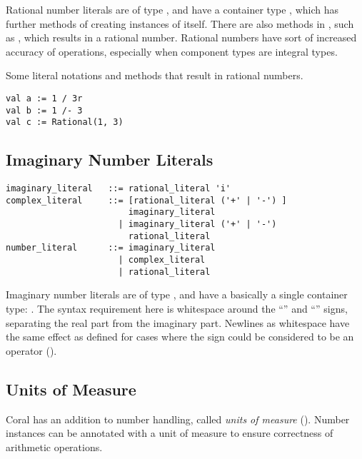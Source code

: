 Rational number literals are of type , and have a container type , which has further methods of creating instances of itself. There are also methods in , such as \code{/-}, which results in a rational number. Rational numbers have sort of increased accuracy of operations, especially when component types are integral types. 

\example Some literal notations and methods that result in rational numbers. 
\begin{lstlisting}
val a := 1 / 3r
val b := 1 /- 3
val c := Rational(1, 3)
\end{lstlisting}







\subsection{Imaginary Number Literals}
\label{sec:imaginaryliterals}

\syntax\begin{lstlisting}
imaginary_literal   ::= rational_literal 'i'
complex_literal     ::= [rational_literal ('+' | '-') ]
                        imaginary_literal
	                  | imaginary_literal ('+' | '-') 
	                    rational_literal
number_literal      ::= imaginary_literal
	                  | complex_literal
	                  | rational_literal
\end{lstlisting}

Imaginary number literals are of type , and have a basically a single container type: . The syntax requirement here is whitespace around the ``\code{+}'' and ``\code{+}'' signs, separating the real part from the imaginary part. Newlines as whitespace have the same effect as defined for cases where the sign could be considered to be an operator ().





\subsection{Units of Measure}
\label{sec:unitsofmeasuresyntax}

Coral has an addition to number handling, called {\em units of measure} (). Number instances can be annotated with a unit of measure to ensure correctness of arithmetic operations. 

